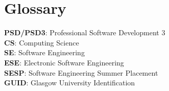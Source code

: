 \documentclass{l3deliverable}
\begin{document}
\section{Glossary}
\textbf{PSD/PSD3}: Professional Software Development 3\\
\textbf{CS}: Computing Science\\
\textbf{SE}: Software Engineering\\
\textbf{ESE}: Electronic Software Engineering\\
\textbf{SESP}: Software Engineering Summer Placement\\
\textbf{GUID}: Glasgow University Identification\\








\end{document}
